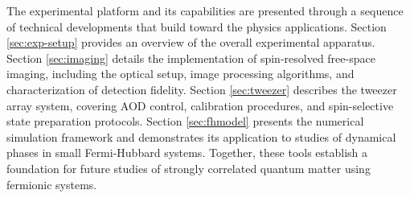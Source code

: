 
The experimental platform and its capabilities are presented through a sequence of technical developments that build toward the physics applications. Section \ref{sec:exp-setup} provides an overview of the overall experimental apparatus. Section \ref{sec:imaging} details the implementation of spin-resolved free-space imaging, including the optical setup, image processing algorithms, and characterization of detection fidelity. Section \ref{sec:tweezer} describes the tweezer array system, covering AOD control, calibration procedures, and spin-selective state preparation protocols. Section \ref{sec:fhmodel} presents the numerical simulation framework and demonstrates its application to studies of dynamical phases in small Fermi-Hubbard systems. Together, these tools establish a foundation for future studies of strongly correlated quantum matter using fermionic systems.